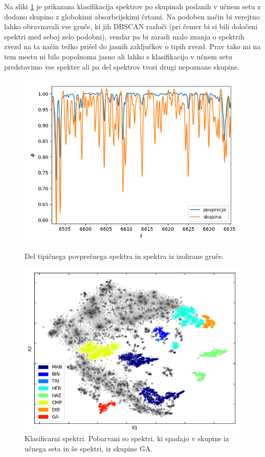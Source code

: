 \documentclass[11pt,a4paper]{article}
\begin{document}
Na sliki \ref{12} je prikazana klasifikacija spektrov po skupinah podanih v učnem setu z dodano skupino z globokimi absorbcijskimi črtami. Na podoben način bi verejtno lahko obravnavali vse gruče, ki jih DBSCAN razloči (pri čemer bi si bili določeni spektri med seboj zelo podobni), vendar pa bi zaradi malo znanja o spektrih zvezd na ta način težko prišel do jasnih zaključkov o tipih zvezd. Prav tako mi na tem mestu ni bilo popolnoma jasno ali lahko s klasifikacijo v učnem setu predstavimo vse spektre ali pa del spektrov tvori drugi nepoznane skupine.

\clearpage

\begin{figure}[h]
    \centering
    \hbox{\hspace{6em}\includegraphics[scale=0.7]{nova_grupa}}
    \caption{Del tipičnega povprečnega spektra in spektra iz izolirane gruče.}
    \label{11}

    \hbox{\hspace{4em}\includegraphics[scale=0.8]{DBSCAN_class}}
    \caption{Klasificarni spektri. Pobarvani so spektri, ki spadajo v skupine iz učnega seta in še spektri, iz skupine GA.}
    \label{12}
\end{figure}
\end{document}
